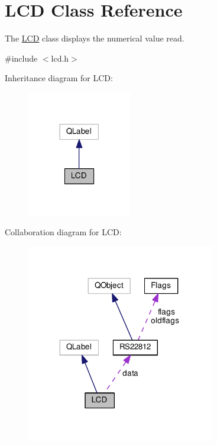 \hypertarget{class_l_c_d}{\section{L\-C\-D Class Reference}
\label{class_l_c_d}
}


The \hyperlink{class_l_c_d}{L\-C\-D} class displays the numerical value read.  




{\ttfamily \#include $<$lcd.\-h$>$}



Inheritance diagram for L\-C\-D\-:\nopagebreak
\begin{figure}[H]
\begin{center}
\leavevmode
\includegraphics[width=129pt]{class_l_c_d__inherit__graph}
\end{center}
\end{figure}


Collaboration diagram for L\-C\-D\-:\nopagebreak
\begin{figure}[H]
\begin{center}
\leavevmode
\includegraphics[width=233pt]{class_l_c_d__coll__graph}
\end{center}
\end{figure}

